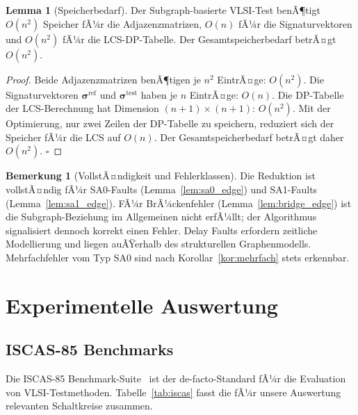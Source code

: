 ﻿\documentclass[a4paper,12pt]{article}
\theoremstyle{definition}
\newtheorem{lemma}{Lemma}
\newtheorem{bemerkung}{Bemerkung}
\begin{document}
\begin{lemma}[Speicherbedarf]
  \label{lem:speicher}
  Der Subgraph-basierte VLSI-Test benÃ¶tigt $O(n^2)$ Speicher fÃ¼r die
  Adjazenzmatrizen, $O(n)$ fÃ¼r die Signaturvektoren und $O(n^2)$ fÃ¼r
  die LCS-DP-Tabelle. Der Gesamtspeicherbedarf betrÃ¤gt $O(n^2)$.
\end{lemma}

\begin{proof}
  Beide Adjazenzmatrizen benÃ¶tigen je $n^2$ EintrÃ¤ge: $O(n^2)$.
  Die Signaturvektoren $\boldsymbol{\sigma}^{\mathrm{ref}}$ und
  $\boldsymbol{\sigma}^{\mathrm{test}}$ haben je $n$ EintrÃ¤ge: $O(n)$.
  Die DP-Tabelle der LCS-Berechnung hat Dimension $(n+1)\times(n+1)$:
  $O(n^2)$. Mit der Optimierung, nur zwei Zeilen der DP-Tabelle zu
  speichern, reduziert sich der Speicher fÃ¼r die LCS auf $O(n)$.
  Der Gesamtspeicherbedarf betrÃ¤gt daher $O(n^2)$. $\square$
\end{proof}

\begin{bemerkung}[VollstÃ¤ndigkeit und Fehlerklassen]
  Die Reduktion ist vollstÃ¤ndig fÃ¼r SA0-Faults (Lemma~\ref{lem:sa0_edge})
  und SA1-Faults (Lemma~\ref{lem:sa1_edge}).
  FÃ¼r BrÃ¼ckenfehler (Lemma~\ref{lem:bridge_edge}) ist die
  Subgraph-Beziehung im Allgemeinen nicht erfÃ¼llt; der Algorithmus
  signalisiert dennoch korrekt einen Fehler.
  Delay Faults erfordern zeitliche Modellierung und liegen auÃŸerhalb
  des strukturellen Graphenmodells.
  Mehrfachfehler vom Typ SA0 sind nach
  Korollar~\ref{kor:mehrfach} stets erkennbar.
\end{bemerkung}

\section{Experimentelle Auswertung}
\label{sec:experimente}

\subsection{ISCAS-85 Benchmarks}

Die ISCAS-85 Benchmark-Suite~\cite{brglez1985combinational} ist der
de-facto-Standard fÃ¼r die Evaluation von VLSI-Testmethoden.
Tabelle~\ref{tab:iscas} fasst die fÃ¼r unsere Auswertung relevanten
Schaltkreise zusammen.
\end{document}
